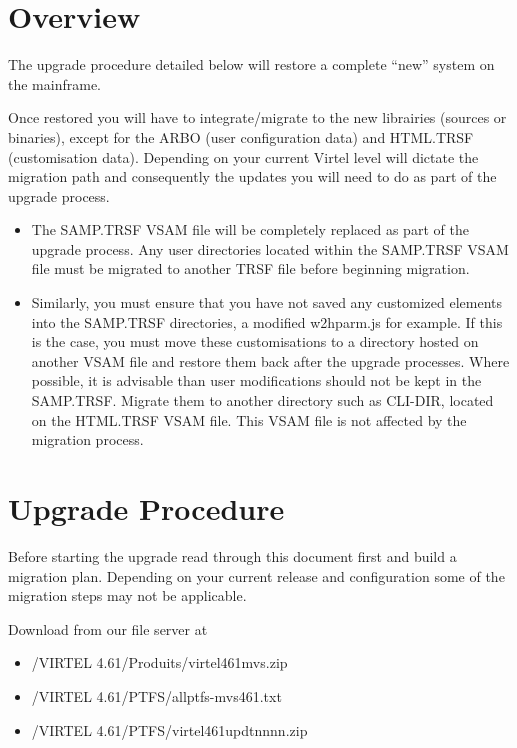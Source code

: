 \documentclass[letterpaper,10pt,english]{sphinxmanual}
\begin{document}
\section{Overview}
\label{\detokenize{Migration_Guide:overview}}
The upgrade procedure detailed below will restore a complete “new” system on the mainframe.

Once restored you will have to integrate/migrate to the new librairies (sources or binaries), except for the ARBO (user configuration data) and HTML.TRSF (customisation data). Depending on your current Virtel level will dictate the migration path and consequently the updates you will need to do as part of the upgrade process.
\begin{itemize}
\item {} 
The SAMP.TRSF VSAM file will be completely replaced as part of the upgrade process. Any user directories located within the SAMP.TRSF VSAM file must be migrated to another TRSF file before beginning migration.

\item {} 
Similarly, you must ensure that you have not saved any customized elements into the SAMP.TRSF directories, a modified w2hparm.js for example. If this is the case, you must move these customisations to a directory hosted on another VSAM file and restore them back after the upgrade processes. Where possible, it is advisable than user modifications should not be kept in the SAMP.TRSF. Migrate them to another directory such as CLI-DIR, located on the HTML.TRSF VSAM file. This VSAM file is not affected by the migration process.

\end{itemize}

\newpage

\ignorespaces 

\section{Upgrade Procedure}
\label{\detokenize{Migration_Guide:upgrade-procedure}}\label{\detokenize{Migration_Guide:index-1}}
Before starting the upgrade read through this document first and build a migration plan. Depending on your current release and configuration some of the migration steps may not be applicable.

Download from our file server at 
\begin{itemize}
\item {} 
/VIRTEL 4.61/Produits/virtel461mvs.zip

\item {} 
/VIRTEL 4.61/PTFS/allptfs-mvs461.txt

\item {} 
/VIRTEL 4.61/PTFS/virtel461updtnnnn.zip

\end{itemize}
\end{document}
